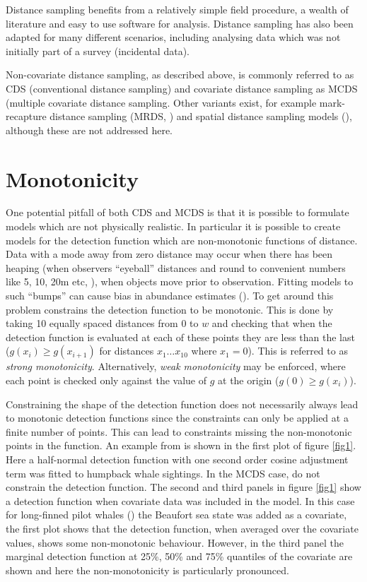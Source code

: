 Distance sampling benefits from a relatively simple field procedure, a wealth of literature and easy to use software for analysis. Distance sampling has also been adapted for many different scenarios, including analysing data which was not initially part of a survey (incidental data).

Non-covariate distance sampling, as described above, is commonly referred to as CDS (conventional distance sampling) and covariate distance sampling as MCDS (multiple covariate distance sampling. Other variants exist, for example mark-recapture distance sampling (MRDS, \cite{mrdspaper}) and spatial distance sampling models (\cite[chapter 4]{ADS}), although these are not addressed here.

\section{Monotonicity}
\label{intro-ds-mono}
One potential pitfall of both CDS and MCDS is that  it is possible to formulate models which are not physically realistic. In particular it is possible to create models for the detection function which are non-monotonic functions of distance. Data with a mode away from zero distance may occur when there has been heaping (when observers ``eyeball'' distances and round to convenient numbers like 5, 10, 20m etc, \cite[pp. 34-35]{IDS}), when objects move prior to observation. Fitting models to such ``bumps'' can cause bias in abundance estimates (\cite[p. 132]{IDS}). To get around this problem  constrains the detection function to be monotonic. This is done by taking 10 equally spaced distances from $0$ to $w$ and checking that when the detection function is evaluated at each of these points they are less than the last ($g(x_i)\geq g(x_{i+1})$ for distances $x_1 \dots x_{10}$ where $x_1=0$). This is referred to as \textit{strong monotonicity}. Alternatively, \textit{weak monotonicity} may be enforced, where each point is checked only against the value of $g$ at the origin ($g(0)\geq g(x_i)$).

Constraining the shape of the detection function does not necessarily always lead to monotonic detection functions since the constraints can only be applied at a finite number of points. This can lead to constraints missing the non-monotonic points in the function. An example from  is shown in the first plot of figure \ref{fig1}. Here a half-normal detection function with one second order cosine adjustment term was fitted to humpback whale sightings. In the MCDS case,  do not constrain the detection function. The second and third panels in figure \ref{fig1} show a detection function when covariate data was included in the model. In this case for long-finned pilot whales (\cite{pike}) the Beaufort sea state was added as a covariate, the first plot shows that the detection function, when averaged over the covariate values, shows some non-monotonic behaviour. However, in the third panel the marginal detection function at 25\%, 50\% and 75\% quantiles of the covariate are shown and here the non-monotonicity is particularly pronounced. 


